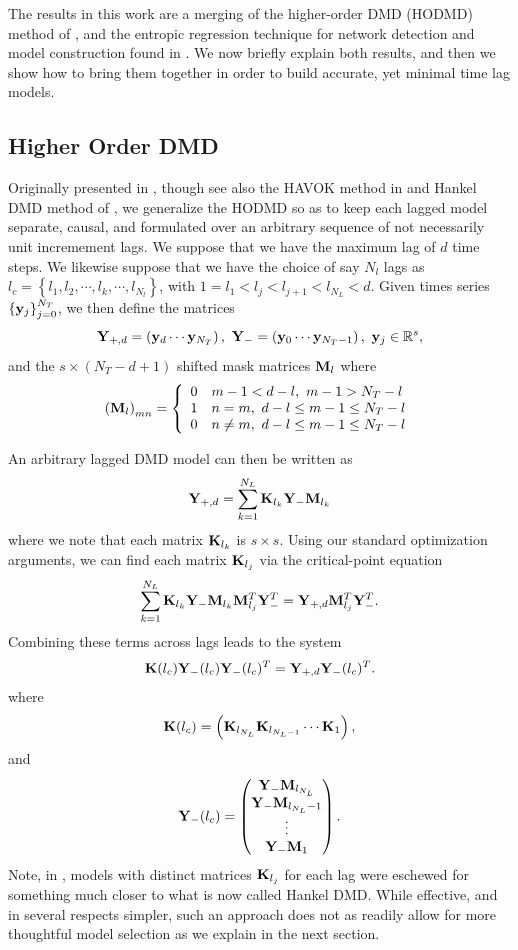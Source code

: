 \documentclass[a4paper,11pt]{article}
\newcommand{\ba}{\begin{array}}
\newcommand{\ea}{\end{array}}
\begin{document}
The results in this work are a merging of the higher-order DMD (HODMD) method of \cite{clainche}, and the entropic regression technique for network detection and model construction found in \cite{bollt, bollt2}.  We now briefly explain both results, and then we show how to bring them together in order to build accurate, yet minimal time lag models.     

\subsection{Higher Order DMD}

Originally presented in \cite{clainche}, though see also the HAVOK method in \cite{brunton_havok} and Hankel DMD method of \cite{arbabi}, we generalize the HODMD so as to keep each lagged model separate, causal, and formulated over an arbitrary sequence of not necessarily unit incremement lags.  We suppose that we have the maximum lag of $d$ time steps.  We likewise suppose that we have the choice of say $N_{l}$ lags as $l_{c}=\left\{l_{1}, l_{2}, \cdots, l_{k}, \cdots, l_{N_{l}}\right\}$, with $1=l_{1} < l_{j} < l_{j+1} < l_{N_{L}}<d$.  Given times series $\left\{{\bf y}_{j}\right\}_{j=0}^{N_{T}}$, we then define the matrices 
\[
{\bf Y}_{+,d} = \left({\bf y}_{d} \cdots {\bf y}_{N_{T}}\right), ~ {\bf Y}_{-} = \left({\bf y}_{0} \cdots {\bf y}_{N_{T}-1}\right), ~ {\bf y}_{j}\in\mathbb{R}^{s},
\]  
and the $s\times (N_{T}-d+1)$ shifted mask matrices ${\bf M}_{l}$ where
\[
\left({\bf M}_{l}\right)_{mn} = \left\{
\ba{rl}
0 & m-1 < d-l, ~ m-1 > N_{T} - l\\
1 & n=m, ~ d-l\leq m-1 \leq N_{T} - l\\
0 & n\neq m, ~ d-l\leq m-1 \leq N_{T} - l
\ea
\right.
\]

An arbitrary lagged DMD model can then be written as 
\[
{\bf Y}_{+,d} = \sum_{k=1}^{N_{L}}{\bf K}_{l_{k}}{\bf Y}_{-}{\bf M}_{l_{k}}
\]
where we note that each matrix ${\bf K}_{l_{k}}$ is $s\times s$.  Using our standard optimization arguments, we can find each matrix ${\bf K}_{l_{j}}$ via the critical-point equation
\[
\sum_{k=1}^{N_{L}}{\bf K}_{l_{k}}{\bf Y}_{-}{\bf M}_{l_{k}}{\bf M}_{l_{j}}^{T}{\bf Y}_{-}^{T} = {\bf Y}_{+,d}{\bf M}_{l_{j}}^{T}{\bf Y}_{-}^{T}.
\]
Combining these terms across lags leads to the system 
\[
{\bf K}(l_{c}) {\bf Y}_{-}(l_{c}){\bf Y}_{-}(l_{c})^{T} = {\bf Y}_{+, d}{\bf Y}_{-}(l_{c})^{T}.
\]
where
\[
{\bf K}(l_{c}) = \left({\bf K}_{l_{N_{L}}} {\bf K}_{l_{N_{L}-1}} \cdots {\bf K}_{1}\right), 
\]
and
\[
{\bf Y}_{-}(l_{c}) = \begin{pmatrix} {\bf Y}_{-}{\bf M}_{l_{N_{L}}} \\ {\bf Y}_{-}{\bf M}_{l_{N_{L}}-1} \\ \vdots \\ {\bf Y}_{-}{\bf M}_{1} \end{pmatrix}.
\]
Note, in \cite{clainche}, models with distinct matrices ${\bf K}_{l_{j}}$ for each lag were eschewed for something much closer to what is now called Hankel DMD.  While effective, and in several respects simpler, such an approach does not as readily allow for more thoughtful model selection as we explain in the next section.  
\end{document}

